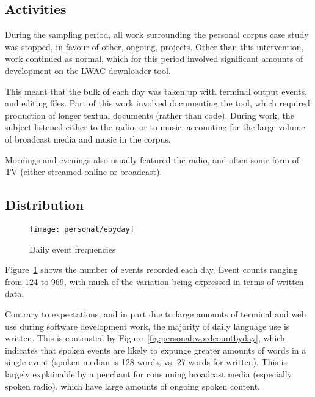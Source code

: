 




\subsection{Activities}
During the sampling period, all work surrounding the personal corpus case study was stopped, in favour of other, ongoing, projects.  Other than this intervention, work continued as normal, which for this period involved significant amounts of development on the LWAC downloader tool.

This meant that the bulk of each day was taken up with terminal output events, and editing files.  Part of this work involved documenting the tool, which required production of longer textual documents (rather than code).  During work, the subject listened either to the radio, or to music, accounting for the large volume of broadcast media and music in the corpus.

Mornings and evenings also usually featured the radio, and often some form of TV (either streamed online or broadcast).







\subsection{Distribution}

\begin{figure}[hp]
    \centering
    \texttt{[image: personal/ebyday]}
    \caption{Daily event frequencies}
    \label{fig:personal:eventcountbyday}
\end{figure}


Figure~\ref{fig:personal:eventcountbyday} shows the number of events recorded each day.  Event counts ranging from 124 to 969, with much of the variation being expressed in terms of written data.

Contrary to expectations, and in part due to large amounts of terminal and web use during software development work, the majority of daily language use is written.  This is contrasted by Figure~\ref{fig:personal:wordcountbyday}, which indicates that spoken events are likely to expunge greater amounts of words in a single event (spoken median is 128 words, vs. 27 words for written).  This is largely explainable by a penchant for consuming broadcast media (especially spoken radio), which have large amounts of ongoing spoken content.


